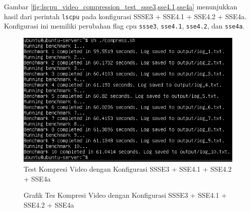 Gambar \ref{fig:lscpu_video_compression_test_ssse3,sse4.1,sse4a} menunjukkan hasil dari perintah \texttt{lscpu} pada konfigurasi SSSE3 + SSE4.1 + SSE4.2 + SSE4a. Konfigurasi ini memiliki perubahan flag cpu \texttt{ssse3}, \texttt{sse4.1}, \texttt{sse4.2}, dan \texttt{sse4a}.

\begin{figure}
    \centering
    \includegraphics[width=1\textwidth]
    {assets/pics/video-compression-test/ssse3,sse4.1,sse4.2,sse4a.jpeg}
    \caption{Test Kompresi Video dengan Konfigurasi SSSE3 + SSE4.1 + SSE4.2 + SSE4a}
    \label{fig:video_compression_test_ssse3,sse4.1,sse4.2,sse4a.jpeg}
\end{figure}

\begin{figure}
    \centering
    \caption{Grafik Tes Kompresi Video dengan Konfigurasi SSSE3 + SSE4.1 + SSE4.2 + SSE4a}
    \label{fig:video_compression_test_ssse3,sse4.1,sse4.2,sse4a_graph}
\end{figure}

